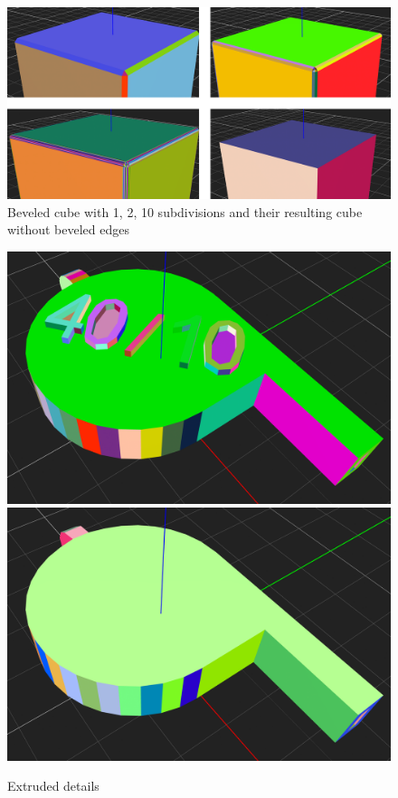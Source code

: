 \documentclass[../ClassicThesis.tex]{subfiles}
\begin{document}

\begin{figure}
\includegraphics[width=1.0\columnwidth]{Images/04-approx-welding-beveled.png}
\caption{Beveled cube with 1, 2, 10 subdivisions and their resulting cube without beveled edges}
\label{fig:beveled}
\end{figure}

\begin{figure}
\includegraphics[width=0.5\columnwidth]{Images/04-approx-welding-beveled-extruded.png}
\includegraphics[width=0.5\columnwidth]{Images/04-approx-welding-beveled-extruded-result.png}
\caption{Extruded details}
\label{fig:extruded_details}
\end{figure}
\end{document}
